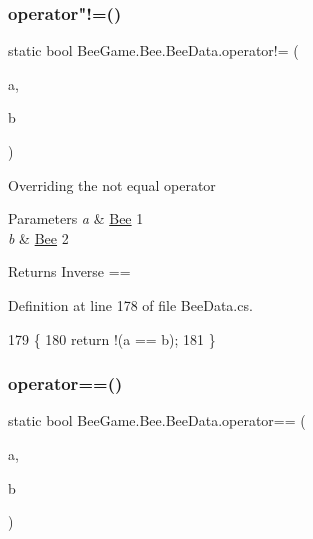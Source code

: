 \subsubsection{\texorpdfstring{operator"!=()}{operator!=()}}
{\footnotesize\ttfamily static bool Bee\+Game.\+Bee.\+Bee\+Data.\+operator!= (\begin{DoxyParamCaption}\item[{\hyperlink{struct_bee_game_1_1_bee_1_1_bee_data}{Bee\+Data}}]{a,  }\item[{\hyperlink{struct_bee_game_1_1_bee_1_1_bee_data}{Bee\+Data}}]{b }\end{DoxyParamCaption})\hspace{0.3cm}{\ttfamily [static]}}



Overriding the not equal operator 


\begin{DoxyParams}{Parameters}
{\em a} & \hyperlink{namespace_bee_game_1_1_bee}{Bee} 1\\
\hline
{\em b} & \hyperlink{namespace_bee_game_1_1_bee}{Bee} 2\\
\hline
\end{DoxyParams}
\begin{DoxyReturn}{Returns}
Inverse ==
\end{DoxyReturn}


Definition at line 178 of file Bee\+Data.\+cs.


\begin{DoxyCode}
179         \{
180             \textcolor{keywordflow}{return} !(a == b);
181         \}
\end{DoxyCode}
\mbox{\label{struct_bee_game_1_1_bee_1_1_bee_data_aafcbf3edbd35377ba1ed6bd1597427f2}} 
\subsubsection{\texorpdfstring{operator==()}{operator==()}}
{\footnotesize\ttfamily static bool Bee\+Game.\+Bee.\+Bee\+Data.\+operator== (\begin{DoxyParamCaption}\item[{\hyperlink{struct_bee_game_1_1_bee_1_1_bee_data}{Bee\+Data}}]{a,  }\item[{\hyperlink{struct_bee_game_1_1_bee_1_1_bee_data}{Bee\+Data}}]{b }\end{DoxyParamCaption})\hspace{0.3cm}{\ttfamily [static]}}



